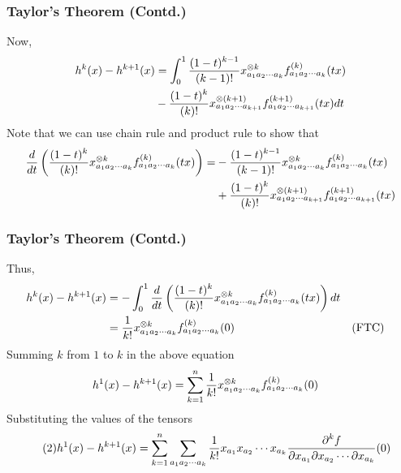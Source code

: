 \begin{frame}
\frametitle{Taylor's Theorem (Contd.)}
Now,
\begin{align*}
h^k(x)-h^{k+1}(x)&=\int_0^1 \frac{\displaystyle (1-t)^{k-1}}{\displaystyle (k-1)!}x^{\otimes k}_{a_1a_2\cdots a_k}f^{(k)}_{a_1a_2\cdots a_k}(tx)\\
&-\frac{\displaystyle (1-t)^{k}}{\displaystyle (k)!}x^{\otimes (k+1)}_{a_1a_2\cdots a_{k+1}}f^{(k+1)}_{a_1a_2\cdots a_{k+1}}(tx)dt
\end{align*}
Note that we can use chain rule and product rule to show that 
\begin{align*}
\frac{\displaystyle d}{\displaystyle dt}\left(\frac{\displaystyle (1-t)^{k}}{\displaystyle (k)!}x^{\otimes k}_{a_1a_2\cdots a_k}f^{(k)}_{a_1a_2\cdots a_k}(tx)\right)=
&-\frac{\displaystyle (1-t)^{k-1}}{\displaystyle (k-1)!}x^{\otimes k}_{a_1a_2\cdots a_k}f^{(k)}_{a_1a_2\cdots a_k}(tx)\\
&+\frac{\displaystyle (1-t)^{k}}{\displaystyle (k)!}x^{\otimes (k+1)}_{a_1a_2\cdots a_{k+1}}f^{(k+1)}_{a_1a_2\cdots a_{k+1}}(tx)
\end{align*}
\end{frame}


\begin{frame}
\frametitle{Taylor's Theorem (Contd.)}
Thus,
\begin{align*}
h^k(x)-h^{k+1}(x)&=-\int_0^1 \frac{\displaystyle d}{\displaystyle dt}\left(\frac{\displaystyle (1-t)^{k}}{\displaystyle (k)!}x^{\otimes k}_{a_1a_2\cdots a_k}f^{(k)}_{a_1a_2\cdots a_k}(tx)\right)dt\\
&=\frac{\displaystyle 1}{\displaystyle k!}x^{\otimes k}_{a_1a_2\cdots a_k}f^{(k)}_{a_1a_2\cdots a_k}(0)&&(\text{FTC})
\end{align*}
Summing $k$ from $1$ to $k$ in the above equation
\begin{align*}
h^1(x)-h^{k+1}(x)&=\sum_{k=1}^{n}\frac{\displaystyle 1}{\displaystyle k!}x^{\otimes k}_{a_1a_2\cdots a_k}f^{(k)}_{a_1a_2\cdots a_k}(0)
\end{align*}
Substituting the values of the tensors
\begin{align*}
\label{eq:2}\tag{2}h^1(x)-h^{k+1}(x)&=\sum_{k=1}^{n}\sum_{a_1a_2\cdots a_k}\frac{\displaystyle 1}{\displaystyle k!}x_{a_1}x_{a_2}\cdots x_{a_k}\frac{\displaystyle \partial^{k}f}{\displaystyle \partial x_{a_1}\partial x_{a_2}\cdots\partial x_{a_k}}(0)
\end{align*}
\end{frame}


